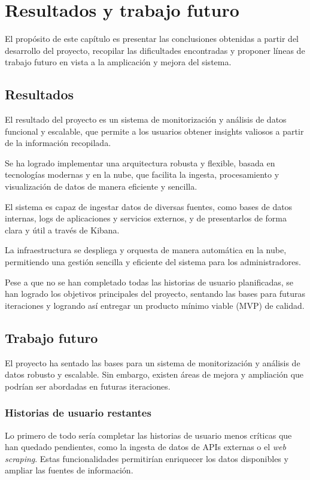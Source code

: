 \chapter{Resultados y trabajo futuro}
El propósito de este capítulo es presentar las conclusiones obtenidas a partir
del desarrollo del proyecto, recopilar las dificultades encontradas y proponer
líneas de trabajo futuro en vista a la amplicación y mejora del sistema.

\section{Resultados}
El resultado del proyecto es un sistema de monitorización y análisis de datos
funcional y escalable, que permite a los usuarios obtener insights valiosos a
partir de la información recopilada.

Se ha logrado implementar una arquitectura robusta y flexible, basada en
tecnologías modernas y en la nube, que facilita la ingesta, procesamiento y
visualización de datos de manera eficiente y sencilla.

El sistema es capaz de ingestar datos de diversas fuentes, como bases de datos
internas, logs de aplicaciones y servicios externos, y de presentarlos de forma
clara y útil a través de Kibana.

La infraestructura se despliega y orquesta de manera automática en la nube,
permitiendo una gestión sencilla y eficiente del sistema para los
administradores.

Pese a que no se han completado todas las historias de usuario planificadas,
se han logrado los objetivos principales del proyecto, sentando las bases para
futuras iteraciones y logrando así entregar un producto mínimo viable (MVP) de
calidad.


\newpage{}
\section{Trabajo futuro}
El proyecto ha sentado las bases para un sistema de monitorización y análisis de
datos robusto y escalable. Sin embargo, existen áreas de mejora y ampliación que
podrían ser abordadas en futuras iteraciones.


\subsection{Historias de usuario restantes}
Lo primero de todo sería completar las historias de usuario menos críticas que
han quedado pendientes, como la ingesta de datos de APIs externas o el
\textit{web scraping}. Estas funcionalidades permitirían enriquecer los datos
disponibles y ampliar las fuentes de información.


